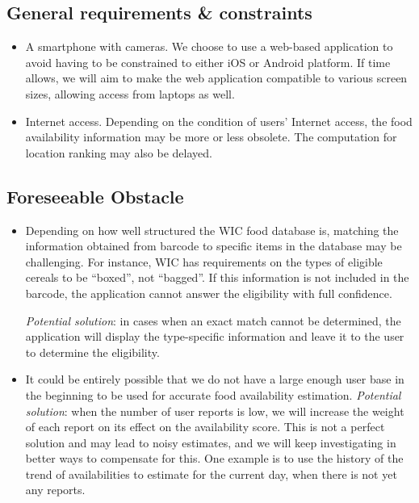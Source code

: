 \documentclass{article}
\begin{document}
\subsection*{General requirements \& constraints}
\begin{itemize}
    \item A smartphone with cameras. We choose to use a web-based application to avoid having to be constrained to either iOS or Android platform. If time allows, we will aim to make the web application compatible to various screen sizes, allowing access from laptops as well.
    \item Internet access. Depending on the condition of users’ Internet access, the food availability information may be more or less obsolete. The computation for location ranking may also be delayed.
\end{itemize}

\subsection*{Foreseeable Obstacle}
\begin{itemize}
    \item Depending on how well structured the WIC food database is, matching the information obtained from barcode to specific items in the database may be challenging. For instance, WIC has requirements on the types of eligible cereals to be “boxed”, not “bagged”. If this information is not included in the barcode, the application cannot answer the eligibility with full confidence.\par
    \textit{Potential solution}: in cases when an exact match cannot be determined, the application will display the type-specific information and leave it to the user to determine the eligibility.
    \item It could be entirely possible that we do not have a large enough user base in the beginning to be used for accurate food availability estimation. 
    \textit{Potential solution}: when the number of user reports is low, we will increase the weight of each report on its effect on the availability score. This is not a perfect solution and may lead to noisy estimates, and we will keep investigating in better ways to compensate for this. One example is to use the history of the trend of availabilities to estimate for the current day, when there is not yet any reports. 
\end{itemize}
\end{document}
